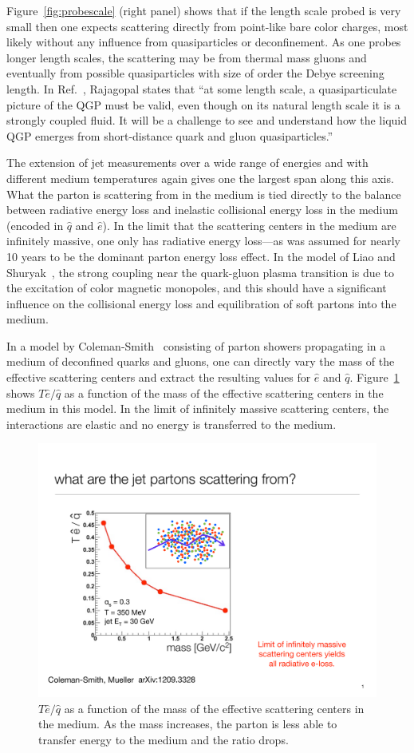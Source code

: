 Figure~\ref{fig:probescale} (right panel) shows that if the length
scale probed is very small then one expects scattering directly from
point-like bare color charges, most likely without any influence from
quasiparticles or deconfinement.  As one probes longer length
scales, the scattering may be from thermal mass gluons and eventually
from possible quasiparticles with size of order the Debye screening
length.  In Ref.~\cite{krishna}, Rajagopal states that ``at some length scale, a
quasiparticulate picture of the QGP must be valid, even though on its
natural length scale it is a strongly coupled fluid.  It will be a
challenge to see and understand how the liquid QGP emerges from
short-distance quark and gluon quasiparticles.''

The extension of jet measurements over a wide range of energies and
with different medium temperatures again gives one the largest span
along this axis.  What the parton is scattering from in the medium is
tied directly to the balance between radiative energy loss and
inelastic collisional energy loss in the medium (encoded in $\hat{q}$ and $\hat{e}$). 
In the limit that the scattering centers in the medium are infinitely massive, one only
has radiative energy loss---as was assumed for nearly 10 years to be
the dominant parton energy loss effect.  In the model of Liao and
Shuryak~\cite{Liao:2008dk}, the strong coupling near the quark-gluon
plasma transition is due to the excitation of color magnetic
monopoles, and this should have a significant influence on the
collisional energy loss and equilibration of soft partons into the
medium.

In a model by Coleman-Smith~\cite{ColemanSmith:2011rw,ColemanSmith:2011wd}
consisting of parton showers propagating in a medium of deconfined
quarks and gluons, one can directly vary the mass of the effective scattering centers and extract
the resulting values for $\hat{e}$ and $\hat{q}$.
Figure~\ref{fig:ehat_qhat} shows $T\hat{e}/\hat{q}$ as a function of
the mass of the effective scattering centers in the medium in this
model.  In the limit of infinitely massive scattering centers, the
interactions are elastic and no energy is transferred to the medium.
\begin{figure}[ht]
  \centering
  \includegraphics[width=0.6\linewidth]{figs/figure_coleman_mass}
  \caption[$T\hat{e}/\hat{q}$ as a function of the mass of the
  effective scattering centers in the medium]{$T\hat{e}/\hat{q}$ as a
    function of the mass of the effective scattering centers in the
    medium.  As the mass increases, the parton is less able to
    transfer energy to the medium and the ratio drops.}
  \label{fig:ehat_qhat}
\end{figure}

